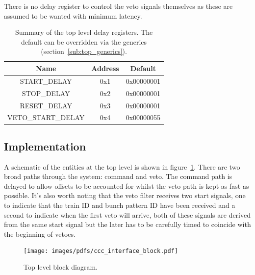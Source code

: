 There is no delay register to control the veto signals themselves as these are assumed to be wanted with minimum latency.
    
\begin{table}
  \begin{center}
    \begin{tabular}{c | c | c }
      Name               & Address & Default    \\
      \hline
      START\_DELAY       & 0x1     & 0x00000001 \\
      STOP\_DELAY        & 0x2     & 0x00000001 \\
      RESET\_DELAY       & 0x3     & 0x00000001 \\
      VETO\_START\_DELAY & 0x4     & 0x00000055 \\
    \end{tabular}
  \end{center}
  \caption{Summary of the top level delay registers. The default can be overridden via the generics (section~\ref{sub:top_generics}).}
  \label{tab:delay_regs}
\end{table}
\subsection{Implementation} %
\label{sub:top_implementation}
A schematic of the entities at the top level is shown in figure~\ref{fig:ccc_interface_entity}. There are two broad paths through the system: command and veto. The command path is delayed to allow offsets to be accounted for whilst the veto path is kept as fast as possible. It's also worth noting that the veto filter receives two start signals, one to indicate that the train ID and bunch pattern ID have been received and a second to indicate when the first veto will arrive, both of these signals are derived from the same start signal but the later has to be carefully timed to coincide with the beginning of vetoes.
    
\begin{figure}[htbp]
  \centering
  \texttt{[image: images/pdfs/ccc\_interface\_block.pdf]}
  \caption{Top level block diagram.}
  \label{fig:ccc_interface_entity}
\end{figure}
    

